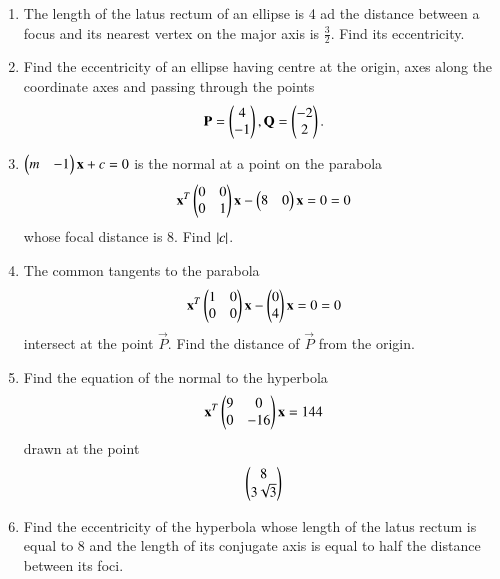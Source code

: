 \documentclass[journal,12pt,twocolumn]{IEEEtran}
\begin{document}
\begin{enumerate}[label=\arabic*.]
\item The length of the latus rectum of an ellipse is 4 ad the distance between a focus and its nearest
vertex on the major axis is $\frac{3}{2}$.  Find its eccentricity.
\item Find the eccentricity of an ellipse having centre at the origin, axes along the coordinate axes and 
passing through the points 
\begin{equation}
\mathbf{P} = \begin{pmatrix}4\\-1\end{pmatrix}, 
\mathbf{Q} = \begin{pmatrix}-2\\2\end{pmatrix}. 
\end{equation}
\item $\begin{pmatrix}m & -1\end{pmatrix}\mathbf{x} + c =0$ is the normal at a point on the parabola
\begin{equation}
\mathbf{x}^T\begin{pmatrix}0 & 0 \\ 0 & 1\end{pmatrix}\mathbf{x} -\begin{pmatrix}8 & 0 \end{pmatrix}\mathbf{x} = 0
 = 0
\end{equation}
%
whose focal distance is 8.  Find $\left\vert c\right\vert$.
\item The common tangents to the parabola
\begin{equation}
\mathbf{x}^T\begin{pmatrix}1 & 0 \\ 0 & 0\end{pmatrix}\mathbf{x} -\begin{pmatrix}0\\ 4 \end{pmatrix}\mathbf{x} = 0
 = 0
\end{equation}
%
intersect at the point $\vec{P}$.  Find the distance of $\vec{P}$ from the origin.
\item Find the equation of the normal to the hyperbola
\begin{equation}
\mathbf{x}^T\begin{pmatrix}9 & 0 \\ 0 & -16\end{pmatrix}\mathbf{x}  = 144
\end{equation}
drawn at the point
\begin{equation}
\begin{pmatrix}8\\ 3 \sqrt{3}\end{pmatrix}
\end{equation}
\item Find the eccentricity of the hyperbola whose length of the latus rectum is equal to 8 and the length of 
its conjugate axis is equal to half the distance between its foci. 

\end{enumerate}
\end{document}
